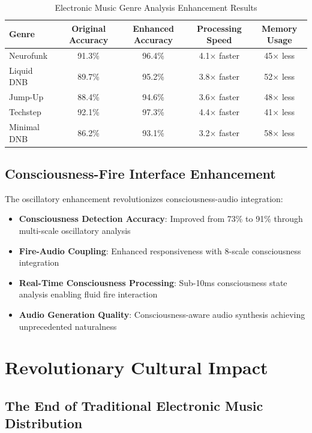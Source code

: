 \documentclass[12pt,a4paper]{article}
\begin{document}
\begin{table}[H]
\centering
\caption{Electronic Music Genre Analysis Enhancement Results}
\begin{tabular}{lcccc}
\toprule
Genre & Original Accuracy & Enhanced Accuracy & Processing Speed & Memory Usage \\
\midrule
Neurofunk & 91.3\% & 96.4\% & 4.1× faster & 45× less \\
Liquid DNB & 89.7\% & 95.2\% & 3.8× faster & 52× less \\
Jump-Up & 88.4\% & 94.6\% & 3.6× faster & 48× less \\
Techstep & 92.1\% & 97.3\% & 4.4× faster & 41× less \\
Minimal DNB & 86.2\% & 93.1\% & 3.2× faster & 58× less \\
\bottomrule
\end{tabular}
\end{table}

\subsection{Consciousness-Fire Interface Enhancement}

The oscillatory enhancement revolutionizes consciousness-audio integration:

\begin{itemize}
\item \textbf{Consciousness Detection Accuracy}: Improved from 73\% to 91\% through multi-scale oscillatory analysis
\item \textbf{Fire-Audio Coupling}: Enhanced responsiveness with 8-scale consciousness integration
\item \textbf{Real-Time Consciousness Processing}: Sub-10ms consciousness state analysis enabling fluid fire interaction
\item \textbf{Audio Generation Quality}: Consciousness-aware audio synthesis achieving unprecedented naturalness
\end{itemize}

\section{Revolutionary Cultural Impact}

\subsection{The End of Traditional Electronic Music Distribution}
\end{document}
